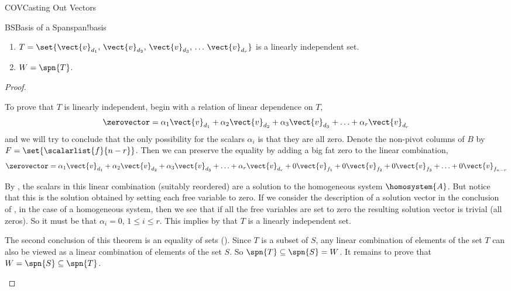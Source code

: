 \begin{subsect}{COV}{Casting Out Vectors}
\begin{theorem}{BS}{Basis of a Span}{span!basis}
\begin{para}
\begin{enumerate}
\item $T=\set{\vect{v}_{d_1},\,\vect{v}_{d_2},\,\vect{v}_{d_3},\,\ldots\,\vect{v}_{d_r}}$ is a linearly independent set.
\item $W=\spn{T}$.
\end{enumerate}
\end{para}
\end{theorem}
%
\begin{proof}
\begin{para}To prove that $T$ is linearly independent, begin with a relation of linear dependence on $T$,
%
\begin{equation*}
\zerovector=
\alpha_1\vect{v}_{d_1}+\alpha_2\vect{v}_{d_2}+\alpha_3\vect{v}_{d_3}+\ldots+\alpha_r\vect{v}_{d_r}
\end{equation*}
and we will try to conclude that the only possibility for the scalars $\alpha_i$ is that they are all zero.
Denote the non-pivot columns of $B$ by $F=\set{\scalarlist{f}{n-r}}$.  Then we can preserve the equality by adding a big fat zero to the linear combination,
%
\begin{equation*}
\zerovector=
\alpha_1\vect{v}_{d_1}+\alpha_2\vect{v}_{d_2}+\alpha_3\vect{v}_{d_3}+\ldots+\alpha_r\vect{v}_{d_r}+
0\vect{v}_{f_1}+0\vect{v}_{f_2}+0\vect{v}_{f_3}+\ldots+0\vect{v}_{f_{n-r}}
\end{equation*}
\end{para}
%
\begin{para}By , the scalars in this linear combination (suitably reordered) are a solution to the homogeneous system $\homosystem{A}$.  But notice that this is the solution obtained by setting each free variable to zero.   If we consider the description of a solution vector in the conclusion of , in the case of a homogeneous system, then we see that if all the free variables are set to zero the resulting solution vector is trivial (all zeros).   So it must be that $\alpha_i=0$, $1\leq i\leq r$.  This implies by  that $T$ is a linearly independent set.\end{para}
%
\begin{para}The second conclusion of this theorem is an equality of sets ().  Since $T$ is a subset of $S$, any linear combination of elements of the set $T$ can also be viewed as a linear combination of elements of the set $S$.  So $\spn{T}\subseteq\spn{S}=W$.  It remains to prove that $W=\spn{S}\subseteq\spn{T}$.\end{para}

\end{proof}
\end{subsect}

